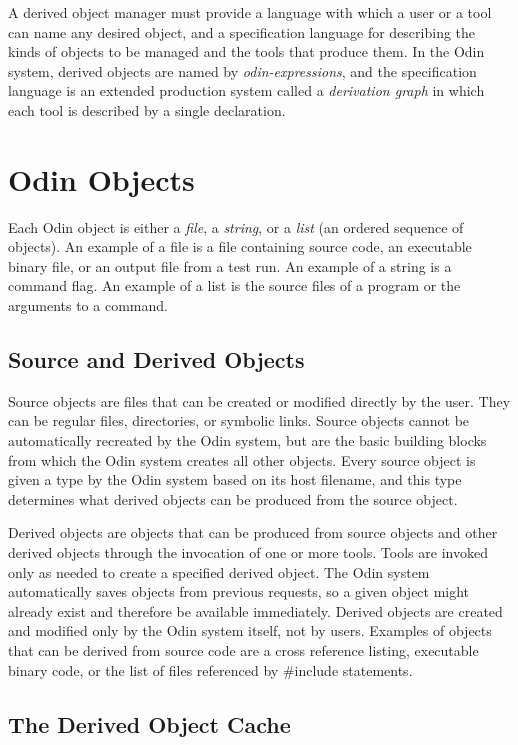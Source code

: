 A derived object manager must provide
a language with which a user or a tool can name any desired object,
and a specification language for describing the kinds of objects to be managed
and the tools that produce them.
In the Odin system,
derived objects are named by {\em odin-expressions},
and the specification language is an extended production system
called a {\em derivation graph}
in which each tool is described by a single declaration.

\section{Odin Objects}

Each Odin object is either
a {\em file}, a {\em string}, or a {\em list} (an ordered sequence of objects).
An example of a file is a file containing source code,
an executable binary file,
or an output file from a test run.
An example of a string is a command flag.
An example of a list is the source files of a program
or the arguments to a command.

\subsection{Source and Derived Objects}

Source objects are files that can be created or modified directly by the user.
They can be regular files, directories, or symbolic links.
Source objects cannot be automatically recreated by the Odin system,
but are the basic building blocks
from which the Odin system creates all other objects.
Every source object is given a type by the Odin system
based on its host filename,
and this type determines what derived objects can be produced from the
source object.

Derived objects are objects that can be produced
from source objects and other derived objects
through the invocation of one or more tools.
Tools are invoked only as needed to create a specified derived object.
The Odin system automatically saves objects from previous requests,
so a given object might already exist and therefore be available immediately.
Derived objects are created and modified only by the Odin system itself,
not by users.
Examples of objects that can be derived from source code are
a cross reference listing, executable binary code, or the list of files
referenced by {\ex \#include} statements.


\subsection{The Derived Object Cache}
\label{cache}

